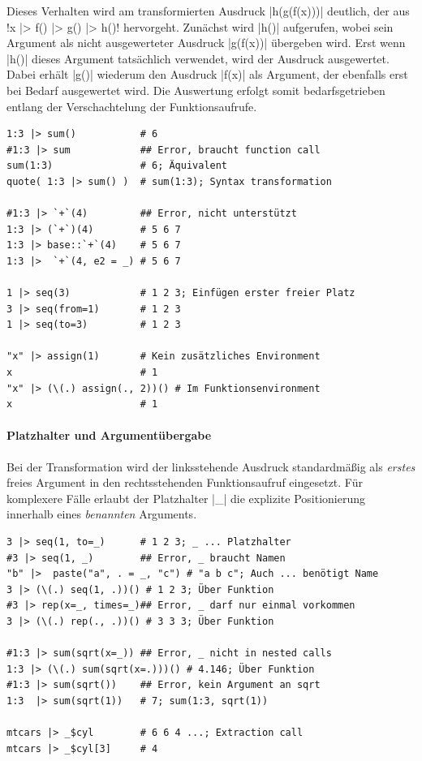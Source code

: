 \documentclass[10pt,twocolumn]{scrartcl}
\renewcommand{\lstinline}{\mycoloredinline}
\begin{document}
Dieses Verhalten wird am transformierten Ausdruck \lstinline|h(g(f(x)))| deutlich, der aus \lstinline!x |> f() |> g() |> h()! hervorgeht. Zunächst wird \lstinline|h()| aufgerufen, wobei sein Argument als nicht ausgewerteter Ausdruck \lstinline|g(f(x))| übergeben wird. Erst wenn \lstinline|h()| dieses Argument tatsächlich verwendet, wird der Ausdruck ausgewertet. Dabei erhält \lstinline|g()| wiederum den Ausdruck \lstinline|f(x)| als Argument, der ebenfalls erst bei Bedarf ausgewertet wird. Die Auswertung erfolgt somit bedarfsgetrieben entlang der Verschachtelung der Funktionsaufrufe.

\begin{lstlisting}
1:3 |> sum()           # 6
#1:3 |> sum            ## Error, braucht function call
sum(1:3)               # 6; Äquivalent
quote( 1:3 |> sum() )  # sum(1:3); Syntax transformation

#1:3 |> `+`(4)         ## Error, nicht unterstützt
1:3 |> (`+`)(4)        # 5 6 7
1:3 |> base::`+`(4)    # 5 6 7
1:3 |>  `+`(4, e2 = _) # 5 6 7

1 |> seq(3)            # 1 2 3; Einfügen erster freier Platz
3 |> seq(from=1)       # 1 2 3
1 |> seq(to=3)         # 1 2 3

"x" |> assign(1)       # Kein zusätzliches Environment
x                      # 1
"x" |> (\(.) assign(., 2))() # Im Funktionsenvironment
x                      # 1
\end{lstlisting}

\paragraph{Platzhalter und Argumentübergabe}

Bei der Transformation wird der linksstehende Ausdruck standardmäßig als \emph{erstes} freies Argument in den rechtsstehenden Funktionsaufruf eingesetzt. Für komplexere Fälle erlaubt der Platzhalter \lstinline|_| die explizite Positionierung innerhalb eines \emph{benannten} Arguments.

\begin{lstlisting}
3 |> seq(1, to=_)      # 1 2 3; _ ... Platzhalter
#3 |> seq(1, _)        ## Error, _ braucht Namen
"b" |>  paste("a", . = _, "c") # "a b c"; Auch ... benötigt Name 
3 |> (\(.) seq(1, .))() # 1 2 3; Über Funktion
#3 |> rep(x=_, times=_)## Error, _ darf nur einmal vorkommen
3 |> (\(.) rep(., .))() # 3 3 3; Über Funktion

#1:3 |> sum(sqrt(x=_)) ## Error, _ nicht in nested calls
1:3 |> (\(.) sum(sqrt(x=.)))() # 4.146; Über Funktion
#1:3 |> sum(sqrt())    ## Error, kein Argument an sqrt
1:3  |> sum(sqrt(1))   # 7; sum(1:3, sqrt(1))

mtcars |> _$cyl        # 6 6 4 ...; Extraction call
mtcars |> _$cyl[3]     # 4
\end{lstlisting}
\end{document}
